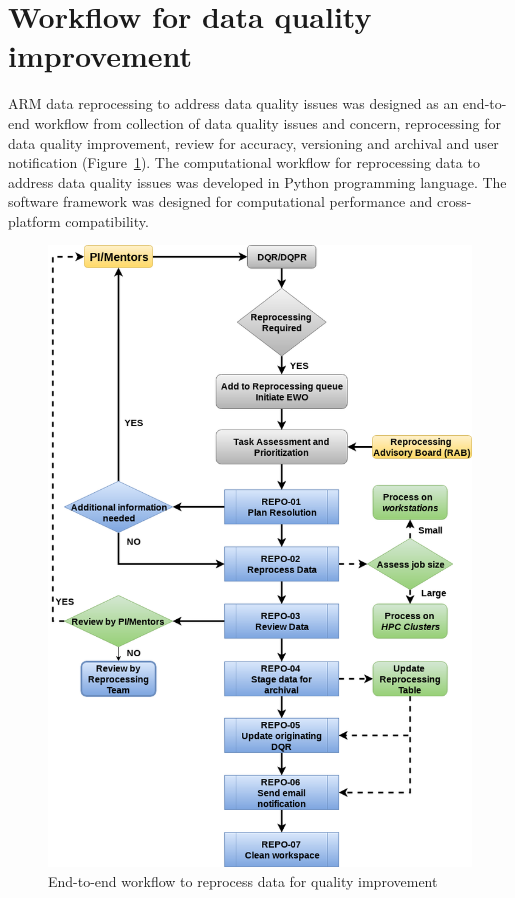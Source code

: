 \section{Workflow for data quality improvement}
ARM data reprocessing to address data quality issues was
designed as an end-to-end workflow from collection of data quality
issues and concern, reprocessing for data quality improvement, review
for accuracy, versioning and archival and user notification (Figure~\ref{fig:flowchart}).
The computational workflow for reprocessing data to address data quality
issues was developed in Python programming language. The software
framework was designed for computational performance and cross-platform
compatibility. 

\begin{figure}
 \includegraphics[width=\linewidth]{figures/reprocessing_flowchart.png}
 \caption{End-to-end workflow to reprocess data for quality improvement}
 \label{fig:flowchart}
\end{figure}












